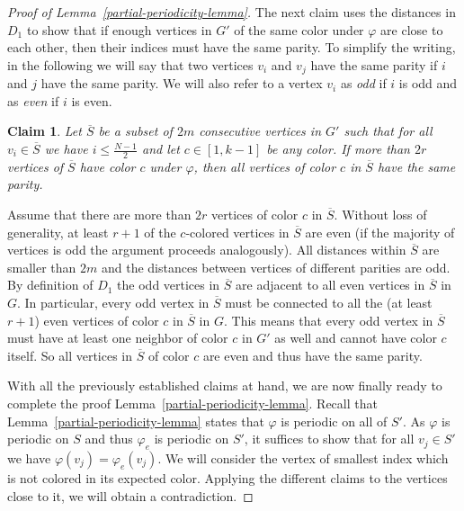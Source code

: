 \documentclass[a4paper,10pt,hidelinks]{amsart}
\renewcommand{\phi}{\ensuremath{\varphi}}
\newtheorem{claim}[theorem]{Claim}
\newenvironment{claimproof}[1][\proofname]{\proof[#1]\renewcommand{\qedsymbol}{$\blacksquare$}}{\endproof}
\theoremstyle{definition}
\begin{document}
\begin{proof}[Proof of Lemma~\ref{partial-periodicity-lemma}]
    The next claim uses the distances in $D_1$ to show that if enough vertices in $G'$ of the same color under $\phi$ are close to each other, then their indices must have the same parity. To simplify the writing, in the following we will say that two vertices $v_i$ and $v_j$ have the same parity if $i$ and $j$ have the same parity. We will also refer to a vertex $v_i$ as \emph{odd} if $i$ is odd and as \emph{even} if $i$ is even.

    \begin{claim}\label{2m-claim}%
        Let $\overline{S}$ be a subset of $2m$ consecutive vertices in $G'$ such that for all $v_i \in \overline{S}$ we have $i \leq \frac{N-1}{2}$ and let $c\in [1,k-1]$ be any color. If more than $2r$ vertices of $\overline{S}$ have color $c$ under $\phi$, then all vertices of color $c$ in $\overline{S}$ have the same parity.
    \end{claim}
    \begin{claimproof}
        Assume that there are more than $2r$ vertices of color $c$ in $\overline{S}$. Without loss of generality, at least $r + 1$ of the $c$-colored vertices in $\overline{S}$ are even (if the majority of vertices is odd the argument proceeds analogously). All distances within $\overline{S}$ are smaller than $2m$ and the distances between vertices of different parities are odd. By definition of $D_1$ the odd vertices in $\overline{S}$ are adjacent to all even vertices in $\overline{S}$ in $G$. In particular, every odd vertex in $\overline{S}$ must be connected to all the (at least $r+1$) even vertices of color $c$ in $\overline{S}$ in $G$. This means that every odd vertex in $\overline{S}$ must have at least one neighbor of color $c$ in $G'$ as well and cannot have color $c$ itself. So all vertices in $\overline{S}$ of color $c$ are even and thus have the same parity.
    \end{claimproof}
        
    With all the previously established claims at hand, we are now finally ready to complete the proof Lemma~\ref{partial-periodicity-lemma}. 
    Recall that Lemma~\ref{partial-periodicity-lemma} states that $\varphi$ is periodic on all of $S'$. As $\varphi$ is periodic on $S$ and thus $\varphi_e$ is periodic on $S'$, it suffices to show that for all $v_j \in S'$ we have $\varphi(v_j) = \varphi_e(v_j)$.
    We will consider the vertex of smallest index which is not colored in its expected color. Applying the different claims to the vertices close to it, we will obtain a contradiction. 


\end{proof}
\end{document}
